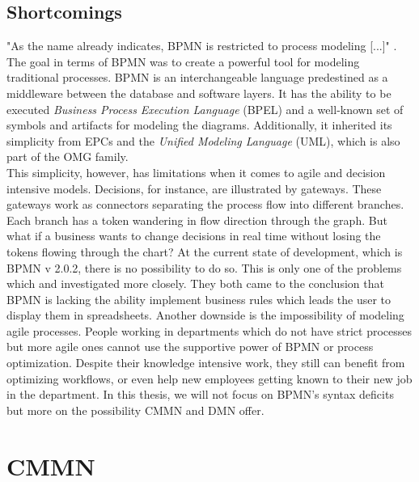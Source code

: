 \subsection{Shortcomings} 
"As the name already indicates, BPMN is restricted to process modeling [...]" \cite{Lankhorst2009}. The goal in terms of BPMN was to create a powerful tool for modeling traditional processes. BPMN is an interchangeable language predestined as a middleware between the database and software layers. It has the ability to be executed \textit{Business Process Execution Language} (BPEL) and a well-known set of symbols and artifacts for modeling the diagrams. Additionally, it inherited its simplicity from EPCs and the \textit{Unified Modeling Language} (UML), which is also part of the OMG family. \\
This simplicity, however, has limitations when it comes to agile and decision intensive models. Decisions, for instance, are illustrated by gateways. These gateways work as connectors separating the process flow into different branches. Each branch has a token wandering in flow direction through the graph. But what if a business wants to change decisions in real time without losing the tokens flowing through the chart? At the current state of development, which is BPMN v 2.0.2, there is no possibility to do so. This is only one of the problems which \cite{Repa2014} and \cite{ReckerIndulskaRosemannEtAl2006} investigated more closely. They both came to the conclusion that BPMN is lacking the ability implement business rules which leads the user to display them in spreadsheets. 
Another downside is the impossibility of modeling agile processes. People working in departments which do not have strict processes but more agile ones cannot use the supportive power of BPMN or process optimization. Despite their knowledge intensive work, they still can benefit from optimizing workflows, or even help new employees getting known to their new job in the department. In this thesis, we will not focus on BPMN's syntax deficits but more on the possibility CMMN and DMN offer. 

\section{CMMN}